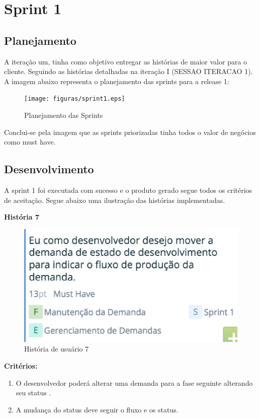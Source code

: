 \chapter[Sprint 1]{Sprint 1}

\section{Planejamento}

A iteração um, tinha como objetivo entregar as histórias de maior valor para o cliente. Seguindo as histórias detalhadas na iteração I (SESSAO ITERACAO 1). A imagem abaixo representa o planejamento das sprints para a release 1:

\begin{figure}[H]
    \centering
	\texttt{[image: figuras/sprint1.eps]}
    \caption{Planejamento das Sprints}
    \label{}
\end{figure}

Conclui-se pela imagem que as sprints priorizadas tinha todos o valor de negócios como must have.

\section{Desenvolvimento}

A sprint 1 foi executada com sucesso e o produto gerado segue todos os critérios de aceitação. Segue abaixo uma ilustração das histórias implementadas.

\textbf{História 7}

\begin{figure}[H]
    \centering
	\includegraphics[keepaspectratio=true,scale=0.6]{figuras/sprint2.eps}
    \caption{História de usuário 7}
    \label{}
\end{figure}

\textbf{Critérios:}
\begin{enumerate}
	\item O desenvolvedor poderá alterar uma demanda para a fase seguinte alterando seu status .
	\item A mudança do status deve seguir o fluxo e os status.
\end{enumerate}

